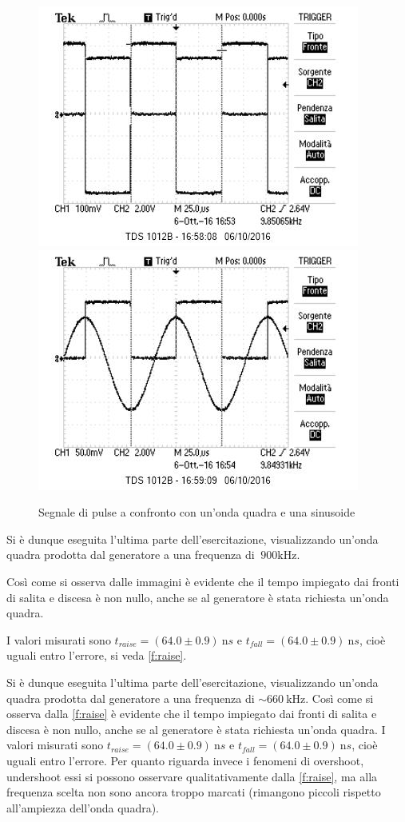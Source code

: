 \documentclass[10pt,a4paper]{article}
\begin{document}
\begin{figure}[h]
	\centering
	\includegraphics[scale=0.6]{../Oscilloscopio/trig_pulse_square.jpg}
	\includegraphics[scale=0.6]{../Oscilloscopio/trig_pulse_sin.jpg}
	\caption{Segnale di pulse a confronto con un'onda quadra e una sinusoide}
	\label{f:pulse}
\end{figure}

Si è dunque eseguita l'ultima parte dell'esercitazione, visualizzando un'onda quadra prodotta dal generatore a una frequenza di $~900 \text{kHz}$.

Così come si osserva dalle immagini è evidente che il tempo impiegato dai fronti di salita e discesa è non nullo, anche se al generatore è stata richiesta un'onda quadra.

I valori misurati sono $t_{raise} = (64.0 \pm 0.9 )~\text{n}s$ e $t_{fall} = (64.0 \pm 0.9)~\text{n}s$, cioè uguali entro l'errore, si veda \figurename{\ref{f:raise}}.

Si è dunque eseguita l'ultima parte dell'esercitazione, visualizzando un'onda quadra prodotta dal generatore a una frequenza di $\sim660~\text{kHz}$.
Così come si osserva dalla \figurename{\ref{f:raise}} è evidente che il tempo impiegato dai fronti di salita e discesa è non nullo, anche se al generatore è stata richiesta un'onda quadra. I valori misurati sono $t_{raise} = (64.0 \pm 0.9 )~\text{n}s$ e $t_{fall} = (64.0 \pm 0.9)~\text{n}s$, cioè uguali entro l'errore. %
Per quanto riguarda invece i fenomeni di overshoot, undershoot essi si possono osservare qualitativamente dalla \figurename{\ref{f:raise}}, ma alla frequenza scelta non sono ancora troppo marcati (rimangono piccoli rispetto all'ampiezza dell'onda quadra).
\end{document}
